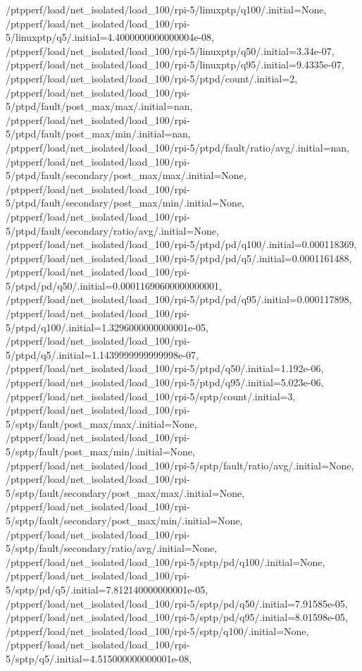 {    /ptpperf/load/net_isolated/load_100/rpi-5/linuxptp/q100/.initial=None,
    /ptpperf/load/net_isolated/load_100/rpi-5/linuxptp/q5/.initial=4.4000000000000004e-08,
    /ptpperf/load/net_isolated/load_100/rpi-5/linuxptp/q50/.initial=3.34e-07,
    /ptpperf/load/net_isolated/load_100/rpi-5/linuxptp/q95/.initial=9.4335e-07,
    /ptpperf/load/net_isolated/load_100/rpi-5/ptpd/count/.initial=2,
    /ptpperf/load/net_isolated/load_100/rpi-5/ptpd/fault/post_max/max/.initial=nan,
    /ptpperf/load/net_isolated/load_100/rpi-5/ptpd/fault/post_max/min/.initial=nan,
    /ptpperf/load/net_isolated/load_100/rpi-5/ptpd/fault/ratio/avg/.initial=nan,
    /ptpperf/load/net_isolated/load_100/rpi-5/ptpd/fault/secondary/post_max/max/.initial=None,
    /ptpperf/load/net_isolated/load_100/rpi-5/ptpd/fault/secondary/post_max/min/.initial=None,
    /ptpperf/load/net_isolated/load_100/rpi-5/ptpd/fault/secondary/ratio/avg/.initial=None,
    /ptpperf/load/net_isolated/load_100/rpi-5/ptpd/pd/q100/.initial=0.000118369,
    /ptpperf/load/net_isolated/load_100/rpi-5/ptpd/pd/q5/.initial=0.0001161488,
    /ptpperf/load/net_isolated/load_100/rpi-5/ptpd/pd/q50/.initial=0.00011690600000000001,
    /ptpperf/load/net_isolated/load_100/rpi-5/ptpd/pd/q95/.initial=0.000117898,
    /ptpperf/load/net_isolated/load_100/rpi-5/ptpd/q100/.initial=1.3296000000000001e-05,
    /ptpperf/load/net_isolated/load_100/rpi-5/ptpd/q5/.initial=1.1439999999999998e-07,
    /ptpperf/load/net_isolated/load_100/rpi-5/ptpd/q50/.initial=1.192e-06,
    /ptpperf/load/net_isolated/load_100/rpi-5/ptpd/q95/.initial=5.023e-06,
    /ptpperf/load/net_isolated/load_100/rpi-5/sptp/count/.initial=3,
    /ptpperf/load/net_isolated/load_100/rpi-5/sptp/fault/post_max/max/.initial=None,
    /ptpperf/load/net_isolated/load_100/rpi-5/sptp/fault/post_max/min/.initial=None,
    /ptpperf/load/net_isolated/load_100/rpi-5/sptp/fault/ratio/avg/.initial=None,
    /ptpperf/load/net_isolated/load_100/rpi-5/sptp/fault/secondary/post_max/max/.initial=None,
    /ptpperf/load/net_isolated/load_100/rpi-5/sptp/fault/secondary/post_max/min/.initial=None,
    /ptpperf/load/net_isolated/load_100/rpi-5/sptp/fault/secondary/ratio/avg/.initial=None,
    /ptpperf/load/net_isolated/load_100/rpi-5/sptp/pd/q100/.initial=None,
    /ptpperf/load/net_isolated/load_100/rpi-5/sptp/pd/q5/.initial=7.812140000000001e-05,
    /ptpperf/load/net_isolated/load_100/rpi-5/sptp/pd/q50/.initial=7.91585e-05,
    /ptpperf/load/net_isolated/load_100/rpi-5/sptp/pd/q95/.initial=8.01598e-05,
    /ptpperf/load/net_isolated/load_100/rpi-5/sptp/q100/.initial=None,
    /ptpperf/load/net_isolated/load_100/rpi-5/sptp/q5/.initial=4.515000000000001e-08,
}

